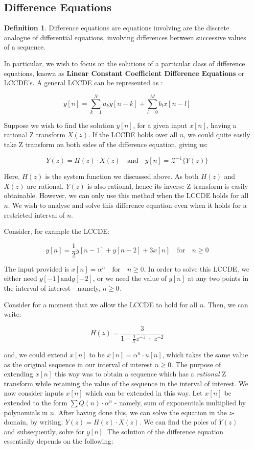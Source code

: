 \documentclass{article}
\theoremstyle{definition}
\newtheorem{defn}[theorem]{Definition}
\begin{document}
\clearpage

\subsection{Difference Equations}

\begin{defn}
Difference equations are equations involving are the discrete analogue of differential equations, involving differences between successive values of a sequence.
\end{defn}

In particular, we wish to focus on the solutions of a particular class of difference equations, known as \textbf{Linear Constant Coefficient Difference Equations} or LCCDE's. A general LCCDE can be represented as :

\[
    y[n] = \sum_{k=1}^{N} a_k y[n-k] + \sum_{l=0}^{M} b_l x[n-l]
\]

Suppose we wish to find the solution $y[n]$, for a given input $x[n]$, having a rational Z transform $X(z)$. If the LCCDE holds over all $n$, we could quite easily take Z transform on both sides of the difference equation, giving us:

\[
    Y(z) = H(z) \cdot X(z) \quad \text{and} \quad y[n] = \mathcal{Z}^{-1} \{ Y(z) \}
\]

Here, $H(z)$ is the system function we discussed above. As both $H(z)$ and $X(z)$ are rational, $Y(z)$ is also rational, hence its inverse Z transform is easily obtainable. However, we can only use this method when the LCCDE holds for all $n$. We wish to analyse and solve this difference equation even when it holds for a restricted interval of $n$.

Consider, for example the LCCDE:

\[
    y[n] = \frac{1}{2}y[n-1] + y[n-2] + 3x[n] \quad \text{for} \quad n \geq 0
\]

The input provided is $x[n] = \alpha^n \quad \text{for} \quad n \geq 0$. In order to solve this LCCDE, we either need $y[-1] \text{and} y[-2]$, or we need the value of $y[n]$ at any two points in the interval of interest - namely, $n \geq 0$.

Consider for a moment that we allow the LCCDE to hold for all $n$. Then, we can write:

\[
    H(z) = \frac{3}{1 - \frac{1}{2}z^{-1} + z^{-2}}
\]

and, we could extend $x[n]$ to be $x[n] = \alpha^n \cdot u[n]$, which takes the same value as the original sequence in our interval of interest $n \geq 0$. The purpose of extending $x[n]$ this way was to obtain a sequence which has a \textit{rational} Z transform while retaining the value of the sequence in the interval of interest. We now consider inputs $x[n]$ which can be extended in this way. Let $x[n]$ be extended to the form $\sum Q(n) \cdot \alpha^n$ - namely, sum of exponentials multiplied by polynomials in $n$. After having done this, we can solve the equation in the $z$-domain, by writing: $Y(z) = H(z) \cdot X(z)$. We can find the poles of $Y(z)$ and subsequently, solve for $y[n]$. The solution of the difference equation essentially depends on the following:
\end{document}
